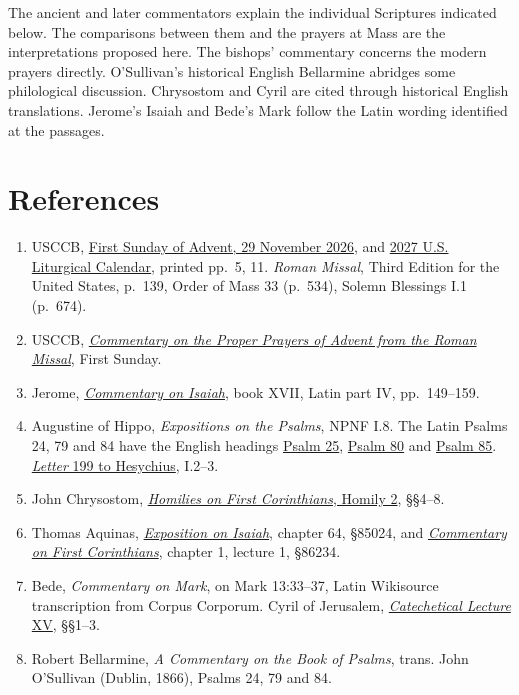 The ancient and later commentators explain the individual Scriptures indicated below. The comparisons between them and the prayers at Mass are the interpretations proposed here. The bishops' commentary concerns the modern prayers directly. O'Sullivan's historical English Bellarmine abridges some philological discussion. Chrysostom and Cyril are cited through historical English translations. Jerome's Isaiah and Bede's Mark follow the Latin wording identified at the passages.

\section{References}
\begin{enumerate}
\item USCCB, \href{https://bible.usccb.org/bible/readings/112926.cfm}{First Sunday of Advent, 29 November 2026}, and \href{https://www.usccb.org/resources/2027cal.pdf}{2027 U.S. Liturgical Calendar}, printed pp.~5, 11. \textit{Roman Missal}, Third Edition for the United States, p.~139, Order of Mass 33 (p.~534), Solemn Blessings I.1 (p.~674).
\item USCCB, \href{https://www.usccb.org/prayer-and-worship/liturgical-year-and-calendar/advent/commentary-on-advent-proper-prayers}{\textit{Commentary on the Proper Prayers of Advent from the Roman Missal}}, First Sunday.
\item Jerome, \href{https://web.archive.org/web/20240709131605id_/https://documentacatholicaomnia.eu/03d/0347-0420,_Hieronymus,_In_Isaiam_Pars_4,_LT.pdf\#page=149}{\textit{Commentary on Isaiah}}, book XVII, Latin part IV, pp.~149--159.
\item Augustine of Hippo, \textit{Expositions on the Psalms}, NPNF I.8. The Latin Psalms 24, 79 and 84 have the English headings \href{https://www.newadvent.org/fathers/1801025.htm}{Psalm 25}, \href{https://www.newadvent.org/fathers/1801080.htm}{Psalm 80} and \href{https://www.newadvent.org/fathers/1801085.htm}{Psalm 85}. \href{https://www.augustinus.it/latino/lettere/lettera_204_testo.htm}{\textit{Letter} 199 to Hesychius}, I.2--3.
\item John Chrysostom, \href{https://www.newadvent.org/fathers/220102.htm}{\textit{Homilies on First Corinthians}, Homily 2}, §§4--8.
\item Thomas Aquinas, \href{https://www.corpusthomisticum.org/cis50.html}{\textit{Exposition on Isaiah}}, chapter 64, §85024, and \href{https://www.corpusthomisticum.org/c1c.html}{\textit{Commentary on First Corinthians}}, chapter 1, lecture 1, §86234.
\item Bede, \textit{Commentary on Mark}, on Mark 13:33--37, Latin Wikisource transcription from Corpus Corporum. Cyril of Jerusalem, \href{https://www.newadvent.org/fathers/310115.htm}{\textit{Catechetical Lecture} XV}, §§1--3.
\item Robert Bellarmine, \textit{A Commentary on the Book of Psalms}, trans. John O'Sullivan (Dublin, 1866), Psalms 24, 79 and 84.
\end{enumerate}
